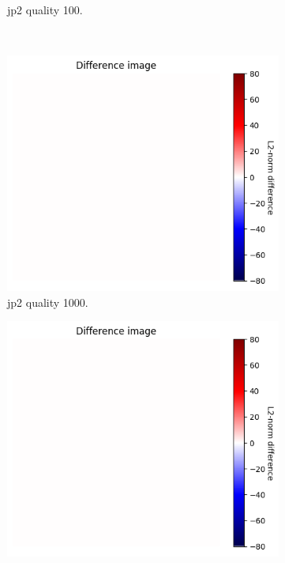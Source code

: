\begin{figure}[htb]
\begin{subfigure}[b]{0.49\textwidth}
            \caption{\gls{jp2} quality 100.}
            \label{fig:img_quality_center_heatmap_100}
        \end{subfigure}
        \\
        \begin{subfigure}[b]{0.49\textwidth}
            \centering
            \includegraphics[width=\textwidth]{doc/thesis/0_figures/compare_quality/set1/heatmap/jp2_1000_center_diff_heatmap.png}
            \caption{\gls{jp2} quality 1000.}
            \label{fig:img_quality_center_heatmap_1000}
        \end{subfigure}
        \begin{subfigure}[b]{0.49\textwidth}
            \centering
            \includegraphics[width=\textwidth]{doc/thesis/0_figures/compare_quality/set1/heatmap/png_center_diff_heatmap.png}

\end{subfigure}
\end{figure}
